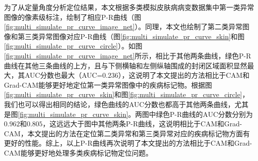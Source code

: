 为了从定量角度分析定位结果，本文根据多类模拟皮肤病病变数据集中第一类异常图像的像素级标注，绘制了相应P-R曲线（图\ref{fig:multi_simulate_pr_curve_image_net}）。同理，本文也绘制了第二类异常图像和第三类异常图像对应P-R曲线（图\ref{fig:multi_simulate_pr_curve_skin}和图\ref{fig:multi_simulate_pr_curve_circle}）。如图\ref{fig:multi_simulate_pr_curve_image_net}所示，相比于其他两条曲线，绿色P-R曲线在其他三条曲线的上方，且与下侧横轴和左侧纵轴围成的封闭区域面积显然最大，其AUC分数也最大（AUC=$0.236$），这说明了本文提出的方法相比于CAM和Grad-CAM能够更好地定位第一类异常图像中的疾病标记物。根据图\ref{fig:multi_simulate_pr_curve_skin}和图\ref{fig:multi_simulate_pr_curve_circle}，我们也可以得出相同的结论，绿色曲线的AUC分数也都高于其他两条曲线，尤其是图\ref{fig:multi_simulate_pr_curve_skin}。两图中绿色P-R曲线的AUC分数分别为$0.962$和$0.805$，这远远大于图中其他两条P-R曲线，这说明相比于CAM和Grad-CAM，本文提出的方法在定位第二类异常和第三类异常对应的疾病标记物方面有更好的性能。综上，以上P-R曲线再次说明了本文提出的方法相比于CAM和Grad-CAM能够更好地处理多类疾病标记物定位问题。
